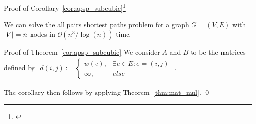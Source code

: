 \begin{frame}{Proof of Corollary~\ref{cor:apsp_subcubic}\footnote[1]{\cite[Corollary~3.3]{Chan2007}}}
    \setcounter{theorem}{3}
    \begin{corollary}
        We can solve the all pairs shortest paths problem for a graph $G = (V, E)$ with $\left\lvert V\right\rvert_{} = n$ nodes in $\mathcal{O}\left( n^3 / \log(n) \right)$ time.
    \end{corollary}
\end{frame}

\begin{frame}{Proof of Theorem~\ref{cor:apsp_subcubic}}
    We consider $A$ and $B$ to be the matrices defined by $\begin{aligned}d(i, j) := \begin{cases}
        w(e), &\exists e \in E: e = (i, j) \\
        \infty, &else
    \end{cases}\end{aligned}$.

    The corollary then follows by applying Theorem~\ref{thm:mat_mul}. \qed{}
\end{frame}
